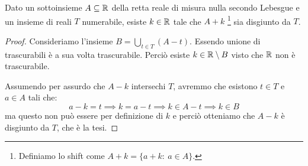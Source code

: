 \begin{exercise}
	Dato un sottoinsieme $A\subseteq\mathbb R$ della retta reale di misura nulla secondo Lebesgue e un insieme di reali $T$ numerabile, esiste $k\in \mathbb R$ tale che $A+k$ \footnote{Definiamo lo shift come $A+k=\{a+k:\ a\in A\}$.} sia disgiunto da $T$.
\end{exercise}
\begin{proof}
	Consideriamo l'insieme $B=\bigcup_{t\in T} (A-t)$. 
	Essendo unione di trascurabili è a sua volta trascurabile.
	Perciò esiste $k\in\mathbb R\setminus B$ visto che $\mathbb R$ non è trascurabile.
	
	Assumendo per assurdo che $A-k$ intersechi $T$, avremmo che esistono $t\in T$ e $a\in A$ tali che:
	\begin{equation*}
		a-k=t\implies k=a-t \implies k\in A-t\implies k\in B	
	\end{equation*}
	ma questo non può essere per definizione di $k$ e perciò otteniamo che $A-k$ è disgiunto da $T$, che è la tesi.
\end{proof}




